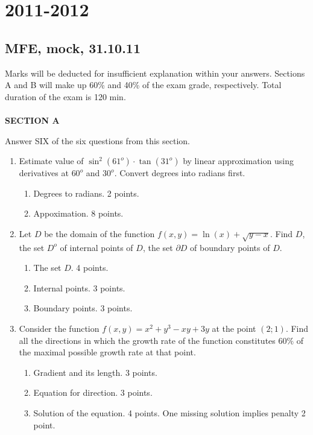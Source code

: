 \documentclass[pdftex,12pt,a4paper]{article}
\begin{document}
\section{2011-2012}

\subsection{MFE, mock, 31.10.11}
Marks will be deducted for insufficient explanation within your answers. Sections A and B will make up 60\% and 40\% of the exam grade, respectively. Total duration of the exam is 120 min. \\ \\
\textbf{SECTION A}

Answer SIX of the six questions from this section.

\begin{enumerate}

\item Estimate value of $\sin^2(61^{o})\cdot\tan(31^{o})$ by linear approximation using derivatives at $60^{o}$ and $30^{o}$. Convert degrees into radians first.

\begin{enumerate}
\item Degrees to radians. 2 points.
\item Appoximation. 8 points.
\end{enumerate}


\item Let $D$ be the domain of the function $f(x,y)=\ln(x)+\sqrt{y-x}$. Find $D$, the set $D^{o}$ of internal points of $D$, the set $\partial D$ of boundary points of $D$.

\begin{enumerate}
\item The set $D$. 4 points.
\item Internal points. 3 points.
\item Boundary points. 3 points.
\end{enumerate}


\item Consider the function $f(x,y)=x^2+y^3-xy+3y$ at the point $(2;1)$. Find all the directions in which the  growth rate of the function constitutes $60\%$ of the maximal possible growth rate at that point.

\begin{enumerate}
\item Gradient and its length. 3 points.
\item Equation for direction. 3 points.
\item Solution of the equation. 4 points. One missing solution implies penalty 2 point.
\end{enumerate}




\end{enumerate}
\end{document}
